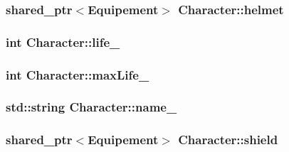 \hypertarget{classCharacter_a0b86c1922a49c65ed6abc04f52b633fb}{
\subsubsection[{helmet}]{\setlength{\rightskip}{0pt plus 5cm}shared\-\_\-ptr$<${\bf Equipement}$>$ Character\-::helmet\hspace{0.3cm}{\ttfamily [protected]}}}\label{classCharacter_a0b86c1922a49c65ed6abc04f52b633fb}
\hypertarget{classCharacter_a7676503674823a7233994c5c6504d3b4}{
\subsubsection[{life\-\_\-}]{\setlength{\rightskip}{0pt plus 5cm}int Character\-::life\-\_\-\hspace{0.3cm}{\ttfamily [protected]}}}\label{classCharacter_a7676503674823a7233994c5c6504d3b4}
\hypertarget{classCharacter_ae9c9e6575e6bca213c523f5dbadc59d8}{
\subsubsection[{max\-Life\-\_\-}]{\setlength{\rightskip}{0pt plus 5cm}int Character\-::max\-Life\-\_\-\hspace{0.3cm}{\ttfamily [protected]}}}\label{classCharacter_ae9c9e6575e6bca213c523f5dbadc59d8}
\hypertarget{classCharacter_aca012a249f706cd301674fff9497b5de}{
\subsubsection[{name\-\_\-}]{\setlength{\rightskip}{0pt plus 5cm}std\-::string Character\-::name\-\_\-\hspace{0.3cm}{\ttfamily [protected]}}}\label{classCharacter_aca012a249f706cd301674fff9497b5de}
\hypertarget{classCharacter_ac74a5ebc37ffa8dcc078c2530c0c947a}{
\subsubsection[{shield}]{\setlength{\rightskip}{0pt plus 5cm}shared\-\_\-ptr$<${\bf Equipement}$>$ Character\-::shield\hspace{0.3cm}{\ttfamily [protected]}}}\label{classCharacter_ac74a5ebc37ffa8dcc078c2530c0c947a}
